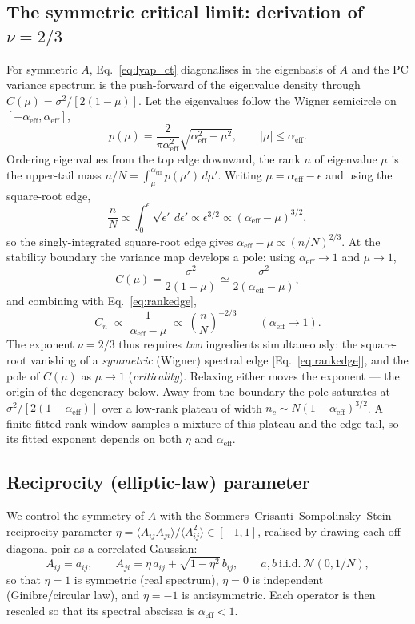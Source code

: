 \documentclass[11pt]{article}
\newcommand{\alphaeff}{\alpha_{\mathrm{eff}}}
\begin{document}
\subsection{The symmetric critical limit: derivation of \texorpdfstring{$\nu=2/3$}{ν=2/3}}
For symmetric $A$, Eq.~\eqref{eq:lyap_ct} diagonalises in the eigenbasis of
$A$ and the PC variance spectrum is the push-forward of the eigenvalue density
through $C(\mu)=\sigma^2/[2(1-\mu)]$. Let the eigenvalues follow the Wigner
semicircle on $[-\alphaeff,\alphaeff]$,
\begin{equation}
p(\mu)=\frac{2}{\pi\alphaeff^2}\sqrt{\alphaeff^2-\mu^2},
\qquad |\mu|\le\alphaeff .
\end{equation}
Ordering eigenvalues from the top edge downward, the rank $n$ of eigenvalue
$\mu$ is the upper-tail mass $n/N=\int_\mu^{\alphaeff}p(\mu')\,d\mu'$. Writing
$\mu=\alphaeff-\epsilon$ and using the square-root edge,
\begin{equation}
\frac{n}{N}\propto\int_0^{\epsilon}\!\sqrt{\epsilon'}\,d\epsilon'
\propto\epsilon^{3/2}
\propto(\alphaeff-\mu)^{3/2},
\label{eq:rankedge}
\end{equation}
so the singly-integrated square-root edge gives
$\alphaeff-\mu\propto(n/N)^{2/3}$. At the stability boundary the variance map
develops a pole: using $\alphaeff\to1$ and
$\mu\to1$,
\begin{equation}
C(\mu)=\frac{\sigma^2}{2(1-\mu)}
\simeq\frac{\sigma^2}{2(\alphaeff-\mu)},
\end{equation}
and combining with Eq.~\eqref{eq:rankedge},
\begin{equation}
\boxed{\,C_n\;\propto\;\frac{1}{\alphaeff-\mu}\;\propto\;
\left(\frac{n}{N}\right)^{-2/3}\qquad(\alphaeff\to1).\,}
\end{equation}
The exponent $\nu=2/3$ thus requires \emph{two} ingredients simultaneously: the
square-root vanishing of a \emph{symmetric} (Wigner) spectral edge
[Eq.~\eqref{eq:rankedge}], and the pole of $C(\mu)$ as $\mu\to1$
(\emph{criticality}). Relaxing either moves the exponent --- the origin of the
degeneracy below. Away from the boundary the pole saturates at
$\sigma^2/[2(1-\alphaeff)]$ over a low-rank plateau of width
$n_c\sim N(1-\alphaeff)^{3/2}$. A finite fitted rank window samples a mixture
of this plateau and the edge tail, so its fitted exponent depends on both
$\eta$ and $\alphaeff$.

\subsection{Reciprocity (elliptic-law) parameter}
We control the symmetry of $A$ with the Sommers--Crisanti--Sompolinsky--Stein
reciprocity parameter\cite{sommers1988}
$\eta=\langle A_{ij}A_{ji}\rangle/\langle A_{ij}^2\rangle\in[-1,1]$,
realised by drawing each off-diagonal pair as a correlated Gaussian:
\begin{equation}
A_{ij}=a_{ij},\qquad A_{ji}=\eta\,a_{ij}+\sqrt{1-\eta^2}\,b_{ij},
\qquad a,b\ \text{i.i.d.}\ \mathcal N(0,1/N),
\end{equation}
so that $\eta=1$ is symmetric (real spectrum), $\eta=0$ is independent
(Ginibre/circular law), and $\eta=-1$ is antisymmetric. Each operator is then
rescaled so that its spectral abscissa is $\alphaeff<1$.
\end{document}
